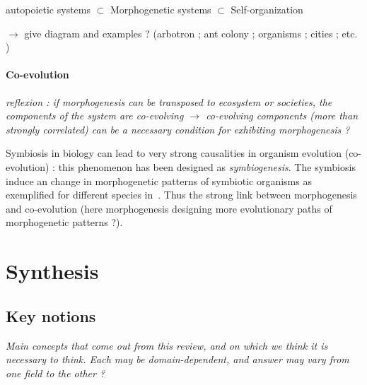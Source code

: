 \documentclass[fleqn,10pt]{wlscirep}
\begin{document}
autopoietic systems $\subset$ Morphogenetic systems $\subset$ Self-organization

$\rightarrow$ give diagram and examples ? (arbotron ; ant colony ; organisms ; cities ; etc. )

\paragraph{Co-evolution}

\textit{reflexion : if morphogenesis can be transposed to ecosystem or societies, the components of the system are co-evolving $\rightarrow$ co-evolving components (more than strongly correlated) can be a necessary condition for exhibiting morphogenesis ?}

Symbiosis in biology can lead to very strong causalities in organism evolution (co-evolution) : this phenomenon has been designed as \emph{symbiogenesis}. The symbiosis induce an change in morphogenetic patterns of symbiotic organisms as exemplified for different species in~\cite{chapman1998morphogenesis}. Thus the strong link between morphogenesis and co-evolution (here morphogenesis designing more evolutionary paths of morphogenetic patterns ?).



\section*{Synthesis}

\subsection*{Key notions}

\textit{Main concepts that come out from this review, and on which we think it is necessary to think. Each may be domain-dependent, and answer may vary from one field to the other ?}
\end{document}
